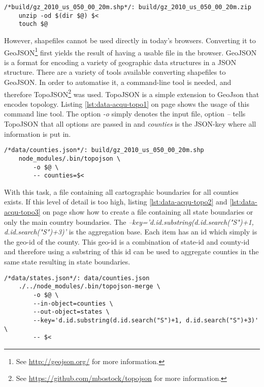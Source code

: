 \begin{lstlisting}[style={makefile}, caption={Make task for unzipping files}, label={lst:data-acqu-unzip}]
/*build/gz_2010_us_050_00_20m.shp*/: build/gz_2010_us_050_00_20m.zip
    unzip -od $(dir $@) $<
    touch $@
\end{lstlisting}

However, shapefiles cannot be used directly in today's browsers. Converting it to GeoJSON\footnote{See \href{http://geojson.org/}{http://geojson.org/} for more information.} first yields the result of having a usable file in the browser. GeoJSON is a format for encoding a variety of geographic data structures in a JSON structure. There are a variety of tools available converting shapefiles to GeoJSON. In order to automatise it, a command-line tool is needed, and therefore TopoJSON\footnote{See \href{https://github.com/mbostock/topojson}{https://github.com/mbostock/topojson} for more information.} was used. TopoJSON is a simple extension to GeoJson that encodes topology. Listing \ref{lst:data-acqu-topo1} on page \pageref{lst:data-acqu-topo1} shows the usage of this command line tool. The option \textit{-o} simply denotes the input file, option \textit{--} tells TopoJSON that all options are passed in and \textit{counties} is the JSON-key where all information is put in.

\begin{lstlisting}[style={makefile}, caption={Make task for converting shapefiles to geojson}, label={lst:data-acqu-topo1}]
/*data/counties.json*/: build/gz_2010_us_050_00_20m.shp
    node_modules/.bin/topojson \
        -o $@ \
        -- counties=$<
\end{lstlisting}

With this task, a file containing all cartographic boundaries for all counties exists. If this level of detail is too high, listing \ref{lst:data-acqu-topo2} and \ref{lst:data-acqu-topo3} on page \pageref{lst:data-acqu-topo2} show how to create a file containing all state boundaries or only the main country boundaries. The \textit{--key='d.id.substring(d.id.search("S")+1, d.id.search("S")+3)'} is the aggregation base. Each item has an id which simply is the geo-id of the county. This geo-id is a combination of state-id and county-id and therefore using a substring of this id can be used to aggregate counties in the same state resulting in state boundaries.

\begin{lstlisting}[style={makefile}, caption={Make task for aggregating counties to states by state-id}, label={lst:data-acqu-topo2}]
/*data/states.json*/: data/counties.json
    ./../node_modules/.bin/topojson-merge \
        -o $@ \
        --in-object=counties \
        --out-object=states \
        --key='d.id.substring(d.id.search("S")+1, d.id.search("S")+3)' \
        -- $<
\end{lstlisting}


